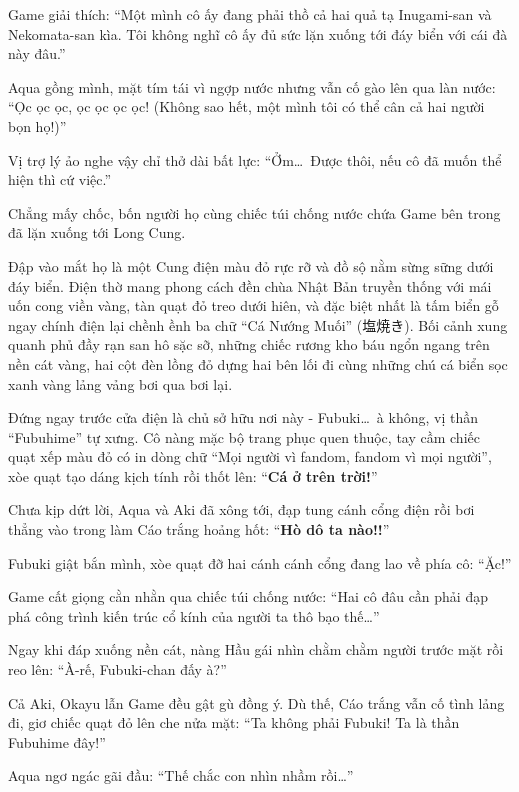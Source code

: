 \documentclass[../main.tex]{subfiles}
\begin{document}
Game giải thích: ``Một mình cô ấy đang phải thồ cả hai quả tạ Inugami-san và Nekomata-san kìa. Tôi không nghĩ cô ấy đủ sức lặn xuống tới đáy biển với cái đà này đâu.''

Aqua gồng mình, mặt tím tái vì ngợp nước nhưng vẫn cố gào lên qua làn nước: ``Ọc ọc ọc, ọc ọc ọc ọc! (Không sao hết, một mình tôi có thể cân cả hai người bọn họ!)''

Vị trợ lý ảo nghe vậy chỉ thở dài bất lực: ``Ởm\dots\ Được thôi, nếu cô đã muốn thể hiện thì cứ việc.''

\ct

Chẳng mấy chốc, bốn người họ cùng chiếc túi chống nước chứa Game bên trong đã lặn xuống tới Long Cung.

Đập vào mắt họ là một Cung điện màu đỏ rực rỡ và đồ sộ nằm sừng sững dưới đáy biển. Điện thờ mang phong cách đền chùa Nhật Bản truyền thống với mái uốn cong viền vàng, tàn quạt đỏ treo dưới hiên, và đặc biệt nhất là tấm biển gỗ ngay chính điện lại chềnh ềnh ba chữ ``Cá Nướng Muối'' (塩焼き). Bối cảnh xung quanh phủ đầy rạn san hô sặc sỡ, những chiếc rương kho báu ngổn ngang trên nền cát vàng, hai cột đèn lồng đỏ dựng hai bên lối đi cùng những chú cá biển sọc xanh vàng lảng vảng bơi qua bơi lại.


Đứng ngay trước cửa điện là chủ sở hữu nơi này - Fubuki\dots\ à không, vị thần ``Fubuhime'' tự xưng. Cô nàng mặc bộ trang phục quen thuộc, tay cầm chiếc quạt xếp màu đỏ có in dòng chữ ``Mọi người vì fandom, fandom vì mọi người'', xòe quạt tạo dáng kịch tính rồi thốt lên: ``\textbf{Cá ở trên trời!}''

Chưa kịp dứt lời, Aqua và Aki đã xông tới, đạp tung cánh cổng điện rồi bơi thẳng vào trong làm Cáo trắng hoảng hốt: ``\textbf{Hò dô ta nào!!}''

Fubuki giật bắn mình, xòe quạt đỡ hai cánh cánh cổng đang lao về phía cô: ``Ặc!''

Game cất giọng cằn nhằn qua chiếc túi chống nước: ``Hai cô đâu cần phải đạp phá công trình kiến trúc cổ kính của người ta thô bạo thế\dots''

Ngay khi đáp xuống nền cát, nàng Hầu gái nhìn chằm chằm người trước mặt rồi reo lên: ``À-rế, Fubuki-chan đấy à?''

Cả Aki, Okayu lẫn Game đều gật gù đồng ý. Dù thế, Cáo trắng vẫn cố tình lảng đi, giơ chiếc quạt đỏ lên che nửa mặt: ``Ta không phải Fubuki! Ta là thần Fubuhime đây!''

Aqua ngơ ngác gãi đầu: ``Thế chắc con nhìn nhầm rồi\dots''
\end{document}
